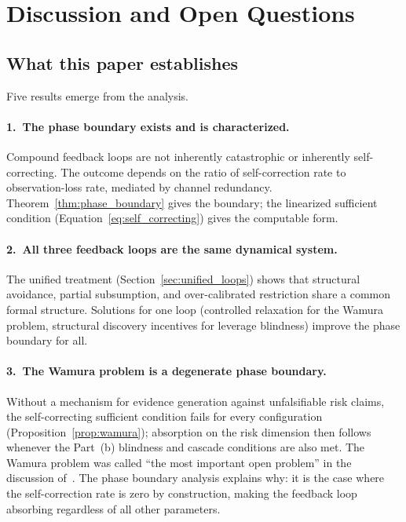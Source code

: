 \section{Discussion and Open Questions}
\label{sec:discussion}

\subsection{What this paper establishes}

Five results emerge from the analysis.

\paragraph{1.\ The phase boundary exists and is characterized.}
Compound feedback loops are not inherently catastrophic or inherently
self-correcting.  The outcome depends on the ratio of self-correction
rate to observation-loss rate, mediated by channel redundancy.
Theorem~\ref{thm:phase_boundary} gives the boundary; the linearized
sufficient condition (Equation~\ref{eq:self_correcting}) gives the
computable form.

\paragraph{2.\ All three feedback loops are the same dynamical system.}
The unified treatment (Section~\ref{sec:unified_loops}) shows that
structural avoidance, partial subsumption, and over-calibrated
restriction share a common formal structure.  Solutions for one loop
(controlled relaxation for the Wamura problem, structural discovery
incentives for leverage blindness) improve the phase boundary for all.

\paragraph{3.\ The Wamura problem is a degenerate phase boundary.}
Without a mechanism for evidence generation against unfalsifiable risk
claims, the self-correcting sufficient condition fails for every
configuration (Proposition~\ref{prop:wamura}); absorption on the risk
dimension then follows whenever the Part~(b) blindness and cascade
conditions are also met.  The Wamura problem was called ``the
most important open problem'' in the discussion
of~\citet{lasser2026horizon}.  The phase boundary analysis explains
why: it is the case where the self-correction rate is zero by
construction, making the feedback loop absorbing regardless of all
other parameters.

